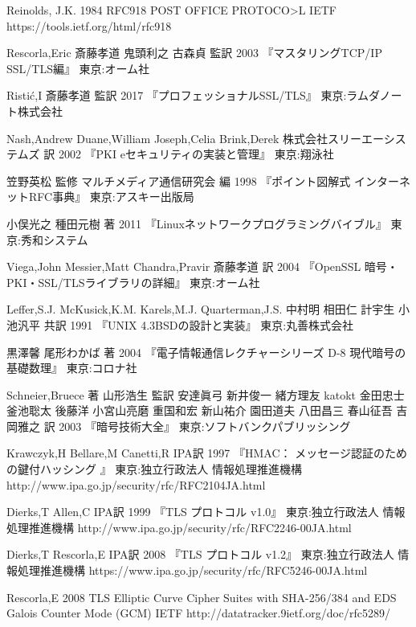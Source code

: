\begin{thebibliography}{99}
\item
	Reinolds, J.K.
	1984
	RFC918 POST OFFICE PROTOCO>L
	IETF
	https://tools.ietf.org/html/rfc918

\item
	Rescorla,Eric
	斎藤孝道 鬼頭利之 古森貞 監訳
	2003
	『マスタリングTCP/IP　SSL/TLS編』
	東京:オーム社
\item
	Risti\'c,I
	斎藤孝道 監訳
	2017
	『プロフェッショナルSSL/TLS』
	東京:ラムダノート株式会社
\item
	Nash,Andrew Duane,William Joseph,Celia Brink,Derek
	株式会社スリーエーシステムズ 訳
	2002
	『PKI eセキュリティの実装と管理』
	東京:翔泳社
\item
	笠野英松 監修
	マルチメディア通信研究会 編
	1998
	『ポイント図解式 インターネットRFC事典』
	東京:アスキー出版局
\item
	小俣光之 種田元樹 著
	2011
	『Linuxネットワークプログラミングバイブル』
	東京:秀和システム
\item
	Viega,John Messier,Matt Chandra,Pravir
	斎藤孝道 訳
	2004
	『OpenSSL 暗号・PKI・SSL/TLSライブラリの詳細』
	東京:オーム社
\item
	Leffer,S.J. McKusick,K.M. Karels,M.J. Quarterman,J.S.
	中村明 相田仁 計宇生 小池汎平 共訳
	1991
	『UNIX 4.3BSDの設計と実装』
	東京:丸善株式会社 
\item
	黒澤馨 尾形わかば 著
	2004
	『電子情報通信レクチャーシリーズ D-8 現代暗号の基礎数理』
	東京:コロナ社
\item
	Schneier,Bruece 著
	山形浩生 監訳
	安達眞弓 新井俊一 緒方理友 katokt 金田忠士 釜池聡太 後藤洋 小宮山亮磨 重国和宏 新山祐介 園田道夫 八田昌三 春山征吾 吉岡雅之 訳
	2003
	『暗号技術大全』
	東京:ソフトバンクパブリッシング
\item
	Krawczyk,H Bellare,M Canetti,R
	IPA訳
	1997
	『HMAC： メッセージ認証のための鍵付ハッシング 』
	東京:独立行政法人 情報処理推進機構
	http://www.ipa.go.jp/security/rfc/RFC2104JA.html
\item
	Dierks,T Allen,C
	IPA訳
	1999
	『TLS プロトコル v1.0』
	東京:独立行政法人 情報処理推進機構
	http://www.ipa.go.jp/security/rfc/RFC2246-00JA.html
\item
	Dierks,T Rescorla,E
	IPA訳
	2008
	『TLS プロトコル v1.2』
	東京:独立行政法人 情報処理推進機構
	https://www.ipa.go.jp/security/rfc/RFC5246-00JA.html
\item
	Rescorla,E
	2008
	TLS Elliptic Curve Cipher Suites with SHA-256/384 and EDS Galois Counter Mode (GCM)
	IETF
	http://datatracker.9ietf.org/doc/rfc5289/

\end{thebibliography}
